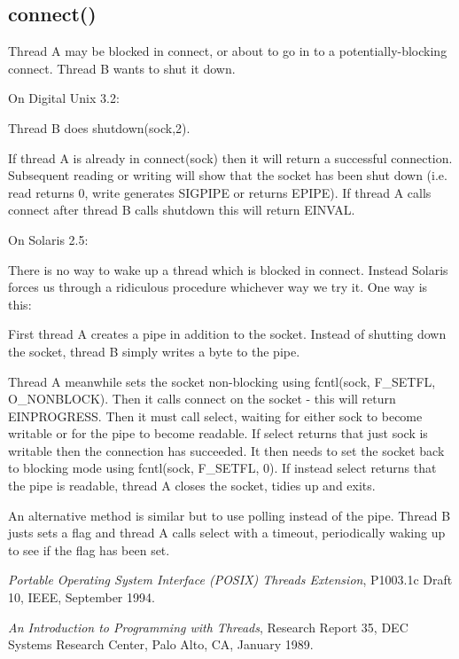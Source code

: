 \documentclass[11pt]{article}
\begin{document}
\subsection{connect()}

Thread A may be blocked in connect, or about to go in to a potentially-blocking
connect.  Thread B wants to shut it down.


On Digital Unix 3.2:

Thread B does shutdown(sock,2).

If thread A is already in connect(sock) then it will return a successful
connection.  Subsequent reading or writing will show that the socket has been
shut down (i.e. read returns 0, write generates SIGPIPE or returns EPIPE).  If
thread A calls connect after thread B calls shutdown this will return EINVAL.


On Solaris 2.5:

There is no way to wake up a thread which is blocked in connect.  Instead
Solaris forces us through a ridiculous procedure whichever way we try it.
One way is this:

First thread A creates a pipe in addition to the socket.  Instead of shutting
down the socket, thread B simply writes a byte to the pipe.

Thread A meanwhile sets the socket non-blocking using fcntl(sock, F\_SETFL,
O\_NONBLOCK).  Then it calls connect on the socket - this will return
EINPROGRESS.  Then it must call select, waiting for either sock to become
writable or for the pipe to become readable.  If select returns that just sock
is writable then the connection has succeeded.  It then needs to set the socket
back to blocking mode using fcntl(sock, F\_SETFL, 0).  If instead select
returns that the pipe is readable, thread A closes the socket, tidies up and
exits.

An alternative method is similar but to use polling instead of the pipe.
Thread B justs sets a flag and thread A calls select with a timeout,
periodically waking up to see if the flag has been set.


\begin{thebibliography}{lo}

{\em Portable Operating System Interface (POSIX) Threads Extension},
P1003.1c Draft 10,
IEEE,
September 1994.

{\em An Introduction to Programming with Threads},
Research Report 35,
DEC Systems Research Center,
Palo Alto, CA,
January 1989.

\end{thebibliography}
\end{document}
